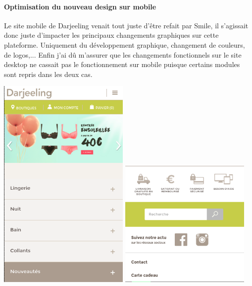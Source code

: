 \documentclass[a4paper,11pt,twoside]{report}
\begin{document}
	\paragraph*{Optimisation du nouveau design sur mobile}
	Le site mobile de Darjeeling venait tout juste d'être refait par Smile, il s'agissait donc juste d'impacter les principaux changements graphiques sur cette plateforme. Uniquement du développement graphique, changement de couleurs, de logos,... Enfin j'ai dû m'assurer que les changements fonctionnels sur le site desktop ne cassait pas le fonctionnement sur mobile puisque certains modules sont repris dans les deux cas. 
	\begin{center}
	  \includegraphics[width=240]{images/darjeeling_mobile_home.png} 
	  \includegraphics[width=240]{images/darjeeling_mobile_footer.png} 
	  \label{darjeeling_mobile}
	\end{center}
\end{document}
